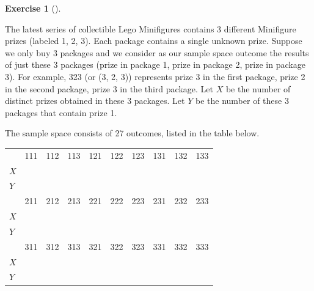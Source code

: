 \documentclass[
  letterpaper,
  DIV=11,
  numbers=noendperiod]{scrreprt}
\theoremstyle{plain}
\theoremstyle{definition}
\theoremstyle{definition}
\newtheorem{exercise}{Exercise}[chapter]
\theoremstyle{definition}
\theoremstyle{remark}
\begin{document}
\begin{exercise}[]\protect\hypertarget{exr-rv-collector3}{}\label{exr-rv-collector3}

The latest series of collectible Lego Minifigures contains 3 different
Minifigure prizes (labeled 1, 2, 3). Each package contains a single
unknown prize. Suppose we only buy 3 packages and we consider as our
sample space outcome the results of just these 3 packages (prize in
package 1, prize in package 2, prize in package 3). For example, 323 (or
(3, 2, 3)) represents prize 3 in the first package, prize 2 in the
second package, prize 3 in the third package. Let \(X\) be the number of
distinct prizes obtained in these 3 packages. Let \(Y\) be the number of
these 3 packages that contain prize 1.

The sample space consists of 27 outcomes, listed in the table below.

\begin{longtable}[]{@{}llllllllll@{}}
\toprule\noalign{}
\endhead
\bottomrule\noalign{}
\endlastfoot
& 111 & 112 & 113 & 121 & 122 & 123 & 131 & 132 & 133 \\
\(X\) & & & & & & & & & \\
\(Y\) & & & & & & & & & \\
& 211 & 212 & 213 & 221 & 222 & 223 & 231 & 232 & 233 \\
\(X\) & & & & & & & & & \\
\(Y\) & & & & & & & & & \\
& 311 & 312 & 313 & 321 & 322 & 323 & 331 & 332 & 333 \\
\(X\) & & & & & & & & & \\
\(Y\) & & & & & & & & & \\
\end{longtable}


\end{exercise}
\end{document}
